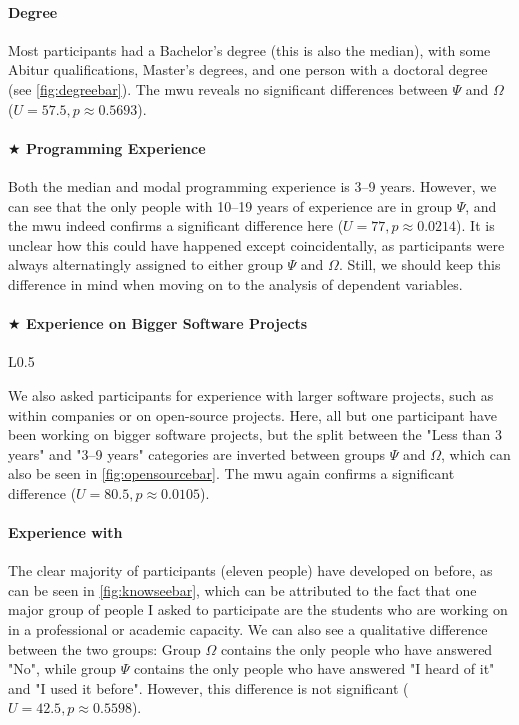 \documentclass[../thesis]{subfiles}
\begin{document}
\paragraph{Degree}
Most participants had a Bachelor's degree (this is also the median), with some Abitur qualifications, Master's degrees, and one person with a doctoral degree (see \cref{fig:degreebar}).
The \gls{mwu} reveals no significant differences between $\Psi$ and $\Omega$ ($U = 57.5, p \approx 0.5693$).

\paragraph{$\bigstar$ Programming Experience}
Both the median and modal programming experience is 3--9 years.
However, we can see that the only people with 10--19 years of experience are in group $\Psi$, and the \gls{mwu} indeed confirms a significant difference here ($U = 77, p \approx 0.0214$).
It is unclear how this could have happened except coincidentally, as participants were always alternatingly assigned to either group $\Psi$ and $\Omega$.
Still, we should keep this difference in mind when moving on to the analysis of dependent variables.

\paragraph{$\bigstar$ Experience on Bigger Software Projects}

\begin{wrapfigure}{L}{0.5\textwidth}
	\centering
	\caption{"How long have you been programming on bigger software projects (\eg, within a company, or open-source projects)?"}\label{fig:opensourcebar}
\end{wrapfigure}

We also asked participants for experience with larger software projects, such as within companies or on open-source projects.
Here, all but one participant have been working on bigger software projects, but the split between the "Less than 3 years" and "3--9 years" categories are inverted between groups $\Psi$ and $\Omega$, which can also be seen in \cref{fig:opensourcebar}.
The \gls{mwu} again confirms a significant difference ($U = 80.5, p \approx 0.0105$).

\paragraph{Experience with \SEE{}}
The clear majority of participants (eleven people) have developed on \SEE{} before, as can be seen in \cref{fig:knowseebar}, which can be attributed to the fact that one major group of people I asked to participate are the students who are working on \SEE{} in a professional or academic capacity.
We can also see a qualitative difference between the two groups:
Group $\Omega$ contains the only people who have answered "No", while group $\Psi$ contains the only people who have answered "I heard of it" and "I used it before".
However, this difference is not significant ($U = 42.5, p \approx 0.5598$).
\end{document}
